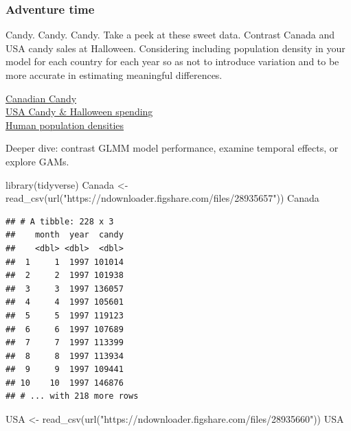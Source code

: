 \documentclass[
]{book}
\newenvironment{Shaded}{\begin{snugshade}}{\end{snugshade}}
\newcommand{\FunctionTok}[1]{\textcolor[rgb]{0.00,0.00,0.00}{#1}}
\newcommand{\NormalTok}[1]{#1}
\newcommand{\OtherTok}[1]{\textcolor[rgb]{0.56,0.35,0.01}{#1}}
\newcommand{\StringTok}[1]{\textcolor[rgb]{0.31,0.60,0.02}{#1}}
\begin{document}
\hypertarget{adventure-time-4}{%
\subsubsection*{Adventure time}\label{adventure-time-4}}

Candy. Candy. Candy. Take a peek at these sweet data. Contrast Canada and USA candy sales at Halloween. Considering including population density in your model for each country for each year so as not to introduce variation and to be more accurate in estimating meaningful differences.

\href{https://figshare.com/articles/dataset/Canadian_Candy_Sales/9876386}{Canadian Candy}\\
\href{https://figshare.com/articles/dataset/USA_Halloween_spending_data/9876380}{USA Candy \& Halloween spending}\\
\href{https://figshare.com/articles/dataset/Human_population_density_data/15047379}{Human population densities}

Deeper dive: contrast GLMM model performance, examine temporal effects, or explore GAMs.

\begin{Shaded}
\begin{Highlighting}[]
\FunctionTok{library}\NormalTok{(tidyverse)}
\NormalTok{Canada }\OtherTok{\textless{}{-}} \FunctionTok{read\_csv}\NormalTok{(}\FunctionTok{url}\NormalTok{(}\StringTok{"https://ndownloader.figshare.com/files/28935657"}\NormalTok{))}
\NormalTok{Canada}
\end{Highlighting}
\end{Shaded}

\begin{verbatim}
## # A tibble: 228 x 3
##    month  year  candy
##    <dbl> <dbl>  <dbl>
##  1     1  1997 101014
##  2     2  1997 101938
##  3     3  1997 136057
##  4     4  1997 105601
##  5     5  1997 119123
##  6     6  1997 107689
##  7     7  1997 113399
##  8     8  1997 113934
##  9     9  1997 109441
## 10    10  1997 146876
## # ... with 218 more rows
\end{verbatim}

\begin{Shaded}
\begin{Highlighting}[]
\NormalTok{USA }\OtherTok{\textless{}{-}} \FunctionTok{read\_csv}\NormalTok{(}\FunctionTok{url}\NormalTok{(}\StringTok{"https://ndownloader.figshare.com/files/28935660"}\NormalTok{))}
\NormalTok{USA}
\end{Highlighting}
\end{Shaded}
\end{document}

